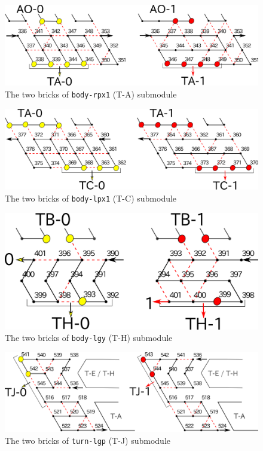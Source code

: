 \documentclass[dvipdfmx,review]{elsarticle}
\begin{document}
\begin{figure}[h]
\centering
\includegraphics[width=\linewidth]{Figs/body-rpx1.png}
\caption{The two bricks of \texttt{body-rpx1} (T-A) submodule}
\label{fig:body-rpx1}
\end{figure}

\begin{figure}[h]
\centering
\includegraphics[width=\linewidth]{Figs/body-lpx1.png}
\caption{The two bricks of \texttt{body-lpx1} (T-C) submodule}
\label{fig:body-lpx1}
\end{figure}

\begin{figure}[h]
\centering
\includegraphics[width=0.7\linewidth]{Figs/body-lgy}
\caption{The two bricks of \texttt{body-lgy} (T-H) submodule}
\label{fig:body-lgy}
\end{figure}

\begin{figure}[h]
\centering
\includegraphics[width=\linewidth]{Figs/turn-lgp}
\caption{The two bricks of \texttt{turn-lgp} (T-J) submodule}
\label{fig:turn-lgp}
\end{figure}
\end{document}
